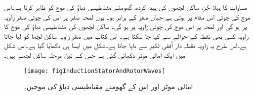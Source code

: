 مساوات   کا پہلا جُز، ساکن لچھوں کی پیدا کردہ، گھومتے مقناطیسی دباؤ کی موج کو ظاہر کرتا ہے۔اس موج کی چوٹی اس مقام پر ہوتی ہے جہاں  صفر کے برابر ہو۔ یوں لمحہ صفر پر اس کی چوٹی صفر زاویہ پر ہو گی اور لمحہ  پر اس موج کی چوٹی زاویہ  پر ہو گی۔ ساکن لچھوں کی مقناطیسی دباؤ کی موج کا زاویہ کسی بھی نقطہ کے حوالے سے کیا جا سکتا ہے۔ اس کتاب میں صفر زاویہ ساکن لچھا  کو لیا جاتا ہے۔اس طرح یہ زاویہ نقطہ دار اُفقی لکیر سے ناپا جاتا ہے۔شکل   میں ایسا ہی دکھایا گیا ہے۔اس شکل میں ایک امالی موٹر دکھائی گئی ہے جس کے تین مرحلہ ساکن لچھے ہیں۔
\begin{figure}
\centering
\texttt{[image: figInductionStatorAndRotorWaves]}
\caption{امالی موٹر اور اس کے گھومتے مقناطیسی دباؤ کی موجیں۔}
\label{شکل_امالی_گھومتی_موجیں}
\end{figure}

